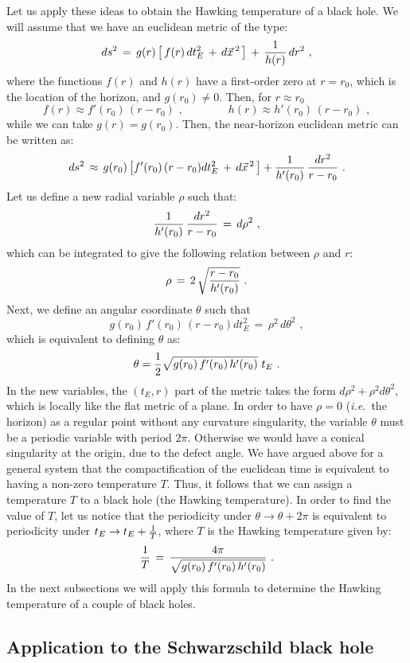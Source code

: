 \documentclass[12pt,notitlepage]{article}
\newcommand{\beq}{\begin{equation}}
\newcommand{\eeq}{\end{equation}}
\def\ie{{\emph{i.e.}}}
\begin{document}
Let us apply these ideas to obtain the Hawking temperature of a black hole. 
We will assume that we have  an euclidean metric of the type:
\beq
ds^2\,=\,g(r)\,\big[\,f(r)\,dt_E^2\,+\,d\vec x^{\,2}\,\big]\,+\,{1\over h(r)}\,dr^2\,\,,
\label{general_BH_metric}
\eeq
where the functions $f(r)$ and $h(r)$ have a first-order zero at $r=r_0$, which is the location of the horizon, and  $g(r_0)\not=0$. Then, for $r\approx r_0$
\beq
f(r)\approx f'(r_0)\,(r-r_0)\,\,,
\qquad\qquad
h(r)\approx h'(r_0)\,(r-r_0)\,\,,
\eeq
while we can take $g(r)=g(r_0)$. Then, the near-horizon euclidean metric can be written as:
\beq
ds^2\,\approx\,g(r_0)\,\big[f'(r_0)\,(r-r_0) dt_E^2\,+\,d\vec x^{\,2}\,\big] +
{1\over h'(r_0)}\,{dr^2\over r-r_0}\,\,.
\eeq
Let us define a new radial variable $\rho$ such that:
\beq
{1\over h'(r_0)}\,{dr^2\over r-r_0}\,=\,d\rho^2\,\,,
\eeq
which can be integrated to give the following relation between $\rho$ and $r$:
\beq
\rho\,=\,2\,\sqrt{{r-r_0\over h'(r_0)}}\,\,.
\eeq
Next, we define an angular coordinate $\theta$ such that
\beq
g(r_0)\,f'(r_0)\,(r-r_0) dt_E^2\,=\,\rho^2\,d\theta^2\,\,,
\eeq
which is equivalent to defining $\theta$ as:
\beq
\theta={1\over 2}
\sqrt{g(r_0)\,f'(r_0)\,h'(r_0)}\,\,t_E\,\,.
\eeq
In the new variables, the $(t_E,r)$ part of the metric takes the form $d\rho^2+\rho^2 d\theta^2$, which is locally like the flat metric of a plane. In order to have $\rho=0$ (\ie\ the horizon) as a regular point without any curvature singularity, the variable  $\theta$ must be a periodic variable with period $2\pi$.  Otherwise we would have a conical singularity at the origin, due to the defect angle. We have argued  above  for a general system that the compactification of the euclidean time is equivalent to having a non-zero temperature $T$. Thus, it follows that we can assign a temperature $T$ to a black hole (the Hawking temperature). In order to find the value of $T$, let us notice that the periodicity under $\theta\to \theta+2\pi$ is equivalent to periodicity under $t_E\to t_E+{1\over T}$, where $T$ is the Hawking temperature given by:
\beq
{1\over T}\,=\,{4\pi\over \sqrt{g(r_0)\,f'(r_0)\,h'(r_0)}}\,\,.
\eeq
In the next subsections we will apply this formula to determine the Hawking temperature of a couple of black holes. 


\subsection{Application to the Schwarzschild black hole}
\end{document}
